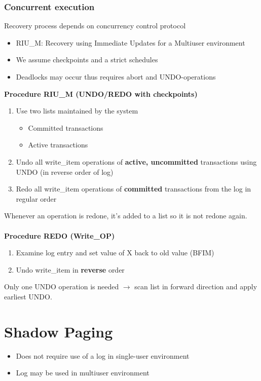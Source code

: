 \subsubsection{Concurrent execution}
Recovery process depends on concurrency control protocol
\begin{itemize}
	\item RIU\_M: Recovery using Immediate Updates for a Multiuser environment
	\item We assume checkpoints and a strict schedules
	\item Deadlocks may occur thus requires abort and UNDO-operations
\end{itemize}
\textbf{Procedure RIU\_M (UNDO/REDO with checkpoints)}
\begin{enumerate}
	\item Use two lists maintained by the system
	\begin{itemize}
		\item Committed transactions
		\item Active transactions
	\end{itemize}
	\item Undo all write\_item operations of \textbf{active, uncommitted} transactions using UNDO (in reverse order of log)
	\item Redo all write\_item operations of \textbf{committed} transactions from the log in regular order
\end{enumerate}
Whenever an operation is redone, it's added to a list so it is not redone again.
\\\\
\textbf{Procedure REDO (Write\_OP)}
\begin{enumerate}
	\item Examine log entry and set value of X back to old value (BFIM)
	\item Undo write\_item in \textbf{reverse} order
\end{enumerate}
Only one UNDO operation is needed $\rightarrow$ scan list in forward direction and apply earliest UNDO.

\section{Shadow Paging}
\begin{itemize}
	\item Does not require use of a log in single-user environment
	\item Log may be used in multiuser environment
\end{itemize}
